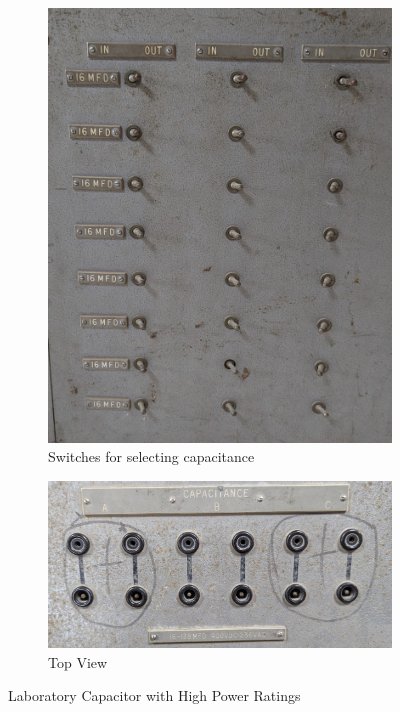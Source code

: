 \documentclass[a4paper,12pt]{article}
\begin{document}
\begin{figure}[H]
{\begin{subfigure}[t]{0.32\textwidth}
			\includegraphics[width=1\linewidth]{Images/13}
			\caption{Switches for selecting capacitance}
		\end{subfigure}
		\hfill
		\begin{subfigure}[t]{0.32\textwidth}
			\centering
			\includegraphics[width=1\linewidth]{Images/14}
			\caption{Top View}
		\end{subfigure}}
		
		\caption{Laboratory Capacitor with High Power Ratings}
		\label{fig:5}
	\end{figure}
	
\end{document}

